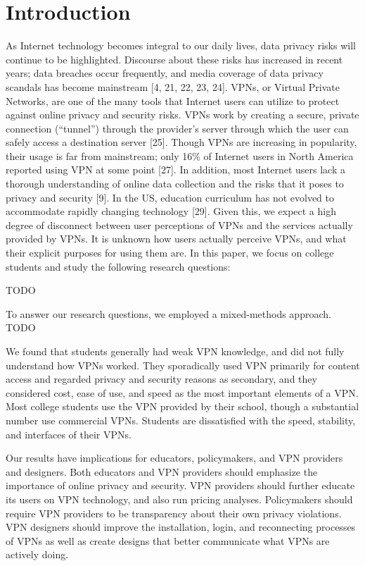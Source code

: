 \section{Introduction}

As Internet technology becomes integral to our daily lives, data privacy risks will continue to be highlighted. Discourse about these risks has increased in recent years; data breaches occur frequently, and media coverage of data privacy scandals has become mainstream [4, 21, 22, 23, 24]. VPNs, or Virtual Private Networks, are one of the many tools that Internet users can utilize to protect against online privacy and security risks. VPNs work by creating a secure, private connection (“tunnel”) through the provider’s server through which the user can safely access a destination server [25]. Though VPNs are increasing in popularity, their usage is far from mainstream; only 16\% of Internet users in North America reported using VPN at some point [27]. In addition, most Internet users lack a thorough understanding of online data collection and the risks that it poses to privacy and security [9]. In the US, education curriculum has not evolved to accommodate rapidly changing technology [29]. Given this, we expect a high degree of disconnect between user perceptions of VPNs and the services actually provided by VPNs. It is unknown how users actually perceive VPNs, and what their explicit purposes for using them are. In this paper, we focus on college students and study the following research questions:

TODO

To answer our research questions, we employed a mixed-methods approach. TODO

We found that students generally had weak VPN knowledge, and did not fully understand how VPNs worked. They sporadically used VPN primarily for content access and regarded privacy and security reasons as secondary, and they considered cost, ease of use, and speed as the most important elements of a VPN. Most college students use the VPN provided by their school, though a substantial number use commercial VPNs. Students are dissatisfied with the speed, stability, and interfaces of their VPNs.

Our results have implications for educators, policymakers, and VPN providers and designers. Both educators and VPN providers should emphasize the importance of online privacy and security. VPN providers should further educate its users on VPN technology, and also run pricing analyses. Policymakers should require VPN providers to be transparency about their own privacy violations. VPN designers should improve the installation, login, and reconnecting processes of VPNs as well as create designs that better communicate what VPNs are actively doing.

